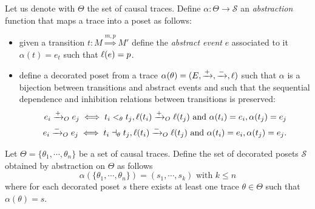 \begin{definition}
  \label{def:abstraction}
  Let us denote with $\Theta$ the set of causal traces.
  Define $\alpha:\Theta\to\mathcal{S}$ an \emph{abstraction} function that maps a trace into a poset as follows:
    \begin{itemize}
    \item given a transition $t:M\overset{m,p}{\Rightarrow} M'$ define the \emph{abstract event} $e$ associated to it
      $\alpha(t) = e_t$ such that $\ell(e) = p$.
    \item define a decorated poset from a trace $\alpha(\theta) = (E,\mathrel{\xrightarrow{+}},\mathrel{\xrightarrow{-}},\ell)$ such that $\alpha$ is a bijection between transitions and abstract events and such that the sequential dependence and inhibition relations between transitions is preserved:
      \begin{align*}
        e_i \mathrel{\xrightarrow{+}}_O e_j \iff t_i <_{\theta} t_j, \ell(t_i) \mathrel{\xrightarrow{+}}_O \ell(t_j)
        \text{ and } \alpha(t_i)=e_i, \alpha(t_j)=e_j\\
        e_i \mathrel{\xrightarrow{-}}_O e_j \iff t_i \dashv_{\theta} t_j, \ell(t_i) \mathrel{\xrightarrow{-}}_O \ell(t_j)
        \text{ and } \alpha(t_i)=e_i, \alpha(t_j)=e_j.
      \end{align*}
    \end{itemize}
    Let $\Theta = \{\theta_1,\cdots,\theta_n\}$ be a set of causal traces.
    Define the set of decorated posets $\mathcal{S}$ obtained by abstraction on $\Theta$ as follows
    \[
    \alpha(\{\theta_1,\cdots,\theta_n\}) = (s_1,\cdots, s_k)\text{ with }k\leq n
    \]
    where for each decorated poset $s$ there exists at least one trace $\theta\in\Theta$ such that $\alpha(\theta) = s$.
\end{definition}

